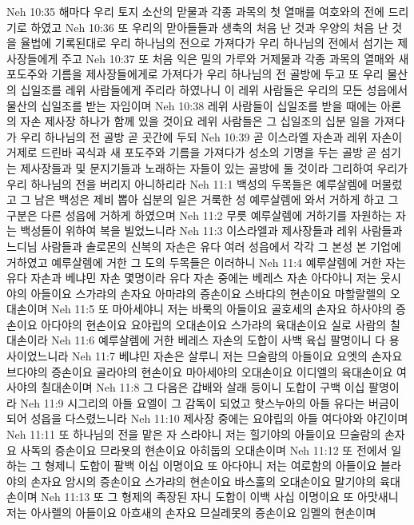 Neh 10:35  해마다 우리 토지 소산의 맏물과 각종 과목의 첫 열매를 여호와의 전에 드리기로 하였고
Neh 10:36  또 우리의 맏아들들과 생축의 처음 난 것과 우양의 처음 난 것을 율법에 기록된대로 우리 하나님의 전으로 가져다가 우리 하나님의 전에서 섬기는 제사장들에게 주고
Neh 10:37  또 처음 익은 밀의 가루와 거제물과 각종 과목의 열매와 새 포도주와 기름을 제사장들에게로 가져다가 우리 하나님의 전 골방에 두고 또 우리 물산의 십일조를 레위 사람들에게 주리라 하였나니 이 레위 사람들은 우리의 모든 성읍에서 물산의 십일조를 받는 자임이며
Neh 10:38  레위 사람들이 십일조를 받을 때에는 아론의 자손 제사장 하나가 함께 있을 것이요 레위 사람들은 그 십일조의 십분 일을 가져다가 우리 하나님의 전 골방 곧 곳간에 두되
Neh 10:39  곧 이스라엘 자손과 레위 자손이 거제로 드린바 곡식과 새 포도주와 기름을 가져다가 성소의 기명을 두는 골방 곧 섬기는 제사장들과 및 문지기들과 노래하는 자들이 있는 골방에 둘 것이라 그리하여 우리가 우리 하나님의 전을 버리지 아니하리라
Neh 11:1  백성의 두목들은 예루살렘에 머물렀고 그 남은 백성은 제비 뽑아 십분의 일은 거룩한 성 예루살렘에 와서 거하게 하고 그 구분은 다른 성읍에 거하게 하였으며
Neh 11:2  무릇 예루살렘에 거하기를 자원하는 자는 백성들이 위하여 복을 빌었느니라
Neh 11:3  이스라엘과 제사장들과 레위 사람들과 느디님 사람들과 솔로몬의 신복의 자손은 유다 여러 성읍에서 각각 그 본성 본 기업에 거하였고 예루살렘에 거한 그 도의 두목들은 이러하니
Neh 11:4  예루살렘에 거한 자는 유다 자손과 베냐민 자손 몇명이라 유다 자손 중에는 베레스 자손 아다야니 저는 웃시야의 아들이요 스가랴의 손자요 아마랴의 증손이요 스바댜의 현손이요 마할랄렐의 오대손이며
Neh 11:5  또 마아세야니 저는 바룩의 아들이요 골호세의 손자요 하사야의 증손이요 아다야의 현손이요 요야립의 오대손이요 스가랴의 육대손이요 실로 사람의 칠대손이라
Neh 11:6  예루살렘에 거한 베레스 자손의 도합이 사백 육십 팔명이니 다 용사이었느니라
Neh 11:7  베냐민 자손은 살루니 저는 므술람의 아들이요 요엣의 손자요 브다야의 증손이요 골라야의 현손이요 마아세야의 오대손이요 이디엘의 육대손이요 여사야의 칠대손이며
Neh 11:8  그 다음은 갑배와 살래 등이니 도합이 구백 이십 팔명이라
Neh 11:9  시그리의 아들 요엘이 그 감독이 되었고 핫스누아의 아들 유다는 버금이 되어 성읍을 다스렸느니라
Neh 11:10  제사장 중에는 요야립의 아들 여다야와 야긴이며
Neh 11:11  또 하나님의 전을 맡은 자 스라야니 저는 힐기야의 아들이요 므술람의 손자요 사독의 증손이요 므라욧의 현손이요 아히둡의 오대손이며
Neh 11:12  또 전에서 일하는 그 형제니 도합이 팔백 이십 이명이요 또 아다야니 저는 여로함의 아들이요 블라야의 손자요 암시의 증손이요 스가랴의 현손이요 바스훌의 오대손이요 말기야의 육대손이며
Neh 11:13  또 그 형제의 족장된 자니 도합이 이백 사십 이명이요 또 아맛새니 저는 아사렐의 아들이요 아흐새의 손자요 므실레못의 증손이요 임멜의 현손이며

